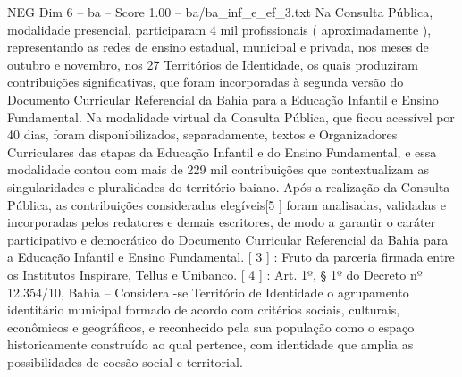 \begin{textsample}{NEG Dim 6 – ba – Score 1.00 – ba/ba\_inf\_e\_ef\_3.txt}
Na Consulta Pública, modalidade presencial, participaram 4 mil profissionais ( aproximadamente ), representando as redes de ensino estadual, municipal e privada, nos meses de outubro e novembro, nos 27 Territórios de Identidade, os quais produziram contribuições significativas, que foram incorporadas à segunda versão do Documento Curricular Referencial da Bahia para a Educação Infantil e Ensino Fundamental.
Na modalidade virtual da Consulta Pública, que ficou acessível por 40 dias, foram disponibilizados, separadamente, textos e Organizadores Curriculares das etapas da Educação Infantil e do Ensino Fundamental, e essa modalidade contou com mais de 229 mil contribuições que contextualizam as singularidades e pluralidades do território baiano.
Após a realização da Consulta Pública, as contribuições consideradas elegíveis[5 ] foram analisadas, validadas e incorporadas pelos redatores e demais escritores, de modo a garantir o caráter participativo e democrático do Documento Curricular Referencial da Bahia para a Educação Infantil e Ensino Fundamental. [ 3 ] : Fruto da parceria firmada entre os Institutos Inspirare, Tellus e Unibanco. [ 4 ] : Art. 1º, § 1º do Decreto nº 12.354/10, Bahia – Considera -se Território de Identidade o agrupamento identitário municipal formado de acordo com critérios sociais, culturais, econômicos e geográficos, e reconhecido pela sua população como o espaço historicamente construído ao qual pertence, com identidade que amplia as possibilidades de coesão social e territorial.

\end{textsample}
